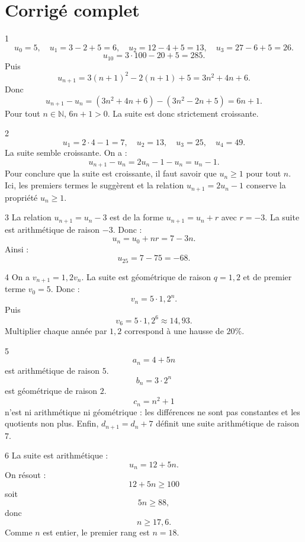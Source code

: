 \documentclass[11pt,a4paper]{article}
\newcommand{\N}{\mathbb{N}}
\begin{document}
\newpage

\section{Corrigé complet}

\begin{solbox}{1}
\[
u_0=5,\quad u_1=3-2+5=6,\quad u_2=12-4+5=13,\quad u_3=27-6+5=26.
\]
\[
u_{10}=3\cdot 100-20+5=285.
\]
Puis
\[
u_{n+1}=3(n+1)^2-2(n+1)+5=3n^2+4n+6.
\]
Donc
\[
u_{n+1}-u_n=(3n^2+4n+6)-(3n^2-2n+5)=6n+1.
\]
Pour tout \(n\in\N\), \(6n+1>0\). La suite est donc strictement croissante.
\end{solbox}

\begin{solbox}{2}
\[
u_1=2\cdot4-1=7,\quad u_2=13,\quad u_3=25,\quad u_4=49.
\]
La suite semble croissante. On a :
\[
u_{n+1}-u_n=2u_n-1-u_n=u_n-1.
\]
Pour conclure que la suite est croissante, il faut savoir que \(u_n\geq 1\) pour tout \(n\). Ici, les premiers termes le suggèrent et la relation \(u_{n+1}=2u_n-1\) conserve la propriété \(u_n\geq1\).
\end{solbox}

\begin{solbox}{3}
La relation \(u_{n+1}=u_n-3\) est de la forme \(u_{n+1}=u_n+r\) avec \(r=-3\). La suite est arithmétique de raison \(-3\). Donc :
\[
u_n=u_0+nr=7-3n.
\]
Ainsi :
\[
u_{25}=7-75=-68.
\]
\end{solbox}

\begin{solbox}{4}
On a \(v_{n+1}=1{,}2v_n\). La suite est géométrique de raison \(q=1{,}2\) et de premier terme \(v_0=5\). Donc :
\[
v_n=5\cdot 1{,}2^n.
\]
Puis
\[
v_6=5\cdot1{,}2^6\approx14{,}93.
\]
Multiplier chaque année par \(1{,}2\) correspond à une hausse de \(20\%\).
\end{solbox}

\begin{solbox}{5}
\[
a_n=4+5n
\]
est arithmétique de raison \(5\).  
\[
b_n=3\cdot 2^n
\]
est géométrique de raison \(2\).  
\[
c_n=n^2+1
\]
n'est ni arithmétique ni géométrique : les différences ne sont pas constantes et les quotients non plus.  
Enfin, \(d_{n+1}=d_n+7\) définit une suite arithmétique de raison \(7\).
\end{solbox}

\begin{solbox}{6}
La suite est arithmétique :
\[
u_n=12+5n.
\]
On résout :
\[
12+5n\geq100
\]
soit
\[
5n\geq88,
\]
donc
\[
n\geq17{,}6.
\]
Comme \(n\) est entier, le premier rang est \(n=18\).
\end{solbox}
\end{document}
